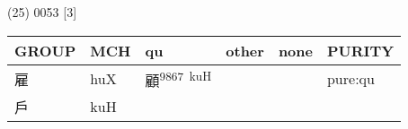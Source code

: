 \documentclass[14pt,a4paper]{scrartcl}
\begin{document}
(25) 0053 {[}3{]}

\begin{longtable}[c]{@{}llllll@{}}
\toprule
\begin{minipage}[b]{0.14\columnwidth}\raggedright\strut
GROUP
\strut\end{minipage} &
\begin{minipage}[b]{0.14\columnwidth}\raggedright\strut
MCH
\strut\end{minipage} &
\begin{minipage}[b]{0.14\columnwidth}\raggedright\strut
qu
\strut\end{minipage} &
\begin{minipage}[b]{0.14\columnwidth}\raggedright\strut
other
\strut\end{minipage} &
\begin{minipage}[b]{0.14\columnwidth}\raggedright\strut
none
\strut\end{minipage} &
\begin{minipage}[b]{0.14\columnwidth}\raggedright\strut
PURITY
\strut\end{minipage}\tabularnewline
\midrule
\endhead
\begin{minipage}[t]{0.14\columnwidth}\raggedright\strut
雇
\strut\end{minipage} &
\begin{minipage}[t]{0.14\columnwidth}\raggedright\strut
huX
\strut\end{minipage} &
\begin{minipage}[t]{0.14\columnwidth}\raggedright\strut
顧\textsuperscript{9867~kuH}
\strut\end{minipage} &
\begin{minipage}[t]{0.14\columnwidth}\raggedright\strut
\strut\end{minipage} &
\begin{minipage}[t]{0.14\columnwidth}\raggedright\strut
\strut\end{minipage} &
\begin{minipage}[t]{0.14\columnwidth}\raggedright\strut
pure:qu
\strut\end{minipage}\tabularnewline
\begin{minipage}[t]{0.14\columnwidth}\raggedright\strut
戶
\strut\end{minipage} &
\begin{minipage}[t]{0.14\columnwidth}\raggedright\strut
kuH
\strut\end{minipage} &
\begin{minipage}[t]{0.14\columnwidth}\raggedright\strut
\strut\end{minipage} &

\end{longtable}
\end{document}
